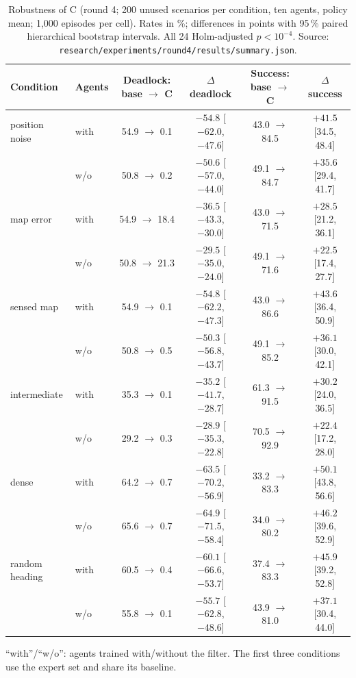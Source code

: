 \documentclass[11pt]{article}
\theoremstyle{definition}
\theoremstyle{remark}
\begin{document}
\begin{table}[t]
\centering\small
\caption{Robustness of C (round 4; 200 unused scenarios per condition, ten agents, policy mean; 1{,}000 episodes per cell). Rates in \%; differences in points with 95\,\% paired hierarchical bootstrap intervals. All 24 Holm-adjusted $p<10^{-4}$. Source: \texttt{research/experiments/round4/results/summary.json}.}
\label{tab:r4}
\setlength{\tabcolsep}{3pt}
\begin{tabular}{@{}llcccc@{}}
\toprule
Condition & Agents & Deadlock: base $\to$ C & $\Delta$ deadlock & Success: base $\to$ C & $\Delta$ success \\
\midrule
position noise & with & 54.9 $\to$ 0.1 & $-54.8$ [$-62.0$, $-47.6$] & 43.0 $\to$ 84.5 & $+41.5$ [34.5, 48.4] \\
 & w/o & 50.8 $\to$ 0.2 & $-50.6$ [$-57.0$, $-44.0$] & 49.1 $\to$ 84.7 & $+35.6$ [29.4, 41.7] \\
map error & with & 54.9 $\to$ 18.4 & $-36.5$ [$-43.3$, $-30.0$] & 43.0 $\to$ 71.5 & $+28.5$ [21.2, 36.1] \\
 & w/o & 50.8 $\to$ 21.3 & $-29.5$ [$-35.0$, $-24.0$] & 49.1 $\to$ 71.6 & $+22.5$ [17.4, 27.7] \\
sensed map & with & 54.9 $\to$ 0.1 & $-54.8$ [$-62.2$, $-47.3$] & 43.0 $\to$ 86.6 & $+43.6$ [36.4, 50.9] \\
 & w/o & 50.8 $\to$ 0.5 & $-50.3$ [$-56.8$, $-43.7$] & 49.1 $\to$ 85.2 & $+36.1$ [30.0, 42.1] \\
intermediate & with & 35.3 $\to$ 0.1 & $-35.2$ [$-41.7$, $-28.7$] & 61.3 $\to$ 91.5 & $+30.2$ [24.0, 36.5] \\
 & w/o & 29.2 $\to$ 0.3 & $-28.9$ [$-35.3$, $-22.8$] & 70.5 $\to$ 92.9 & $+22.4$ [17.2, 28.0] \\
dense & with & 64.2 $\to$ 0.7 & $-63.5$ [$-70.2$, $-56.9$] & 33.2 $\to$ 83.3 & $+50.1$ [43.8, 56.6] \\
 & w/o & 65.6 $\to$ 0.7 & $-64.9$ [$-71.5$, $-58.4$] & 34.0 $\to$ 80.2 & $+46.2$ [39.6, 52.9] \\
random heading & with & 60.5 $\to$ 0.4 & $-60.1$ [$-66.6$, $-53.7$] & 37.4 $\to$ 83.3 & $+45.9$ [39.2, 52.8] \\
 & w/o & 55.8 $\to$ 0.1 & $-55.7$ [$-62.8$, $-48.6$] & 43.9 $\to$ 81.0 & $+37.1$ [30.4, 44.0] \\
\bottomrule
\end{tabular}

\smallskip
{\footnotesize ``with''/``w/o'': agents trained with/without the filter. The first three conditions use the expert set and share its baseline.}
\end{table}
\end{document}
